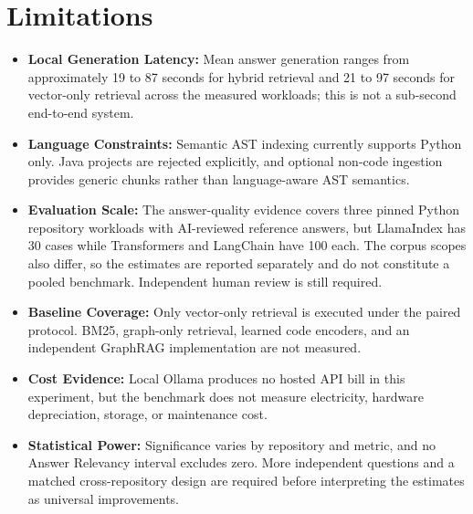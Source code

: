 \documentclass[12pt,letterpaper,oneside]{report}
\begin{document}
\section{Limitations}
\label{sec:limitations}
\begin{itemize}
    \item \textbf{Local Generation Latency:} Mean answer generation ranges from approximately 19 to 87 seconds for hybrid retrieval and 21 to 97 seconds for vector-only retrieval across the measured workloads; this is not a sub-second end-to-end system.
    \item \textbf{Language Constraints:} Semantic AST indexing currently supports Python only. Java projects are rejected explicitly, and optional non-code ingestion provides generic chunks rather than language-aware AST semantics.
    \item \textbf{Evaluation Scale:} The answer-quality evidence covers three pinned Python repository workloads with AI-reviewed reference answers, but LlamaIndex has 30 cases while Transformers and LangChain have 100 each. The corpus scopes also differ, so the estimates are reported separately and do not constitute a pooled benchmark. Independent human review is still required.
    \item \textbf{Baseline Coverage:} Only vector-only retrieval is executed under the paired protocol. BM25, graph-only retrieval, learned code encoders, and an independent GraphRAG implementation are not measured.
    \item \textbf{Cost Evidence:} Local Ollama produces no hosted API bill in this experiment, but the benchmark does not measure electricity, hardware depreciation, storage, or maintenance cost.
    \item \textbf{Statistical Power:} Significance varies by repository and metric, and no Answer Relevancy interval excludes zero. More independent questions and a matched cross-repository design are required before interpreting the estimates as universal improvements.
\end{itemize}
\end{document}
